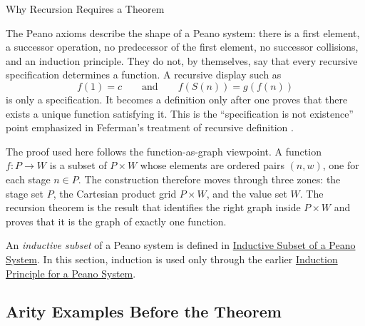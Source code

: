 \begin{topicbox}{Why Recursion Requires a Theorem}
\begin{exposition}
The Peano axioms describe the shape of a Peano system: there is a first
element, a successor operation, no predecessor of the first element, no
successor collisions, and an induction principle. They do not, by themselves,
say that every recursive specification determines a function. A recursive
display such as
\[
f(1)=c
\qquad\text{and}\qquad
f(S(n))=g(f(n))
\]
is only a specification. It becomes a definition only after one proves that
there exists a unique function satisfying it. This is the ``specification is
not existence'' point emphasized in Feferman's treatment of recursive
definition \cite[p.~67]{FefermanNumberSystems1964}.

The proof used here follows the function-as-graph viewpoint. A function
$f:P\to W$ is a subset of $P\times W$ whose elements are ordered pairs
$(n,w)$, one for each stage $n\in P$. The construction therefore moves through
three zones: the stage set $P$, the Cartesian product grid $P\times W$, and
the value set $W$. The recursion theorem is the result that identifies the
right graph inside $P\times W$ and proves that it is the graph of exactly one
function.
\end{exposition}

\begin{remark*}
An \emph{inductive subset} of a Peano system is defined in
\hyperref[def:inductive-subset-of-peano-system]{Inductive Subset of a Peano
System}. In this section, induction is used only through the earlier
\hyperref[thm:induction-principle-for-peano-system]{Induction Principle for a
Peano System}.
\end{remark*}
\end{topicbox}

\subsection*{Arity Examples Before the Theorem}

